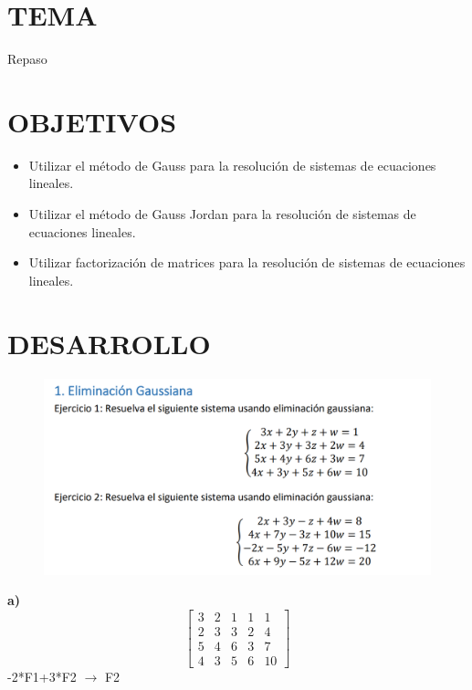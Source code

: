 \documentclass[12pt]{article}
\begin{document}
\section*{TEMA}
Repaso

\vspace{0.5cm}

\section*{OBJETIVOS}
\begin{itemize}
    \item Utilizar el método de Gauss para la  resolución de sistemas de ecuaciones lineales.
    \item Utilizar el método de Gauss Jordan para la resolución de sistemas de ecuaciones lineales.
    \item Utilizar factorización de matrices para la resolución de sistemas de ecuaciones lineales. 
\end{itemize}

\vspace{0.5cm}


\section*{DESARROLLO}

\begin{figure}[H]
\includegraphics[width=1\textwidth]{./inFiles/Figures/Ej1.png}
\end{figure}

\textbf{a)}
\[
\begin{bmatrix}
3 & 2 & 1 & 1 & 1\\
2 & 3 & 3 & 2 & 4 \\
5 & 4 & 6 & 3 & 7 \\
4 & 3 & 5 & 6 & 10
\end{bmatrix}
\]
-2*F1+3*F2 $\longrightarrow $ F2
\end{document}
